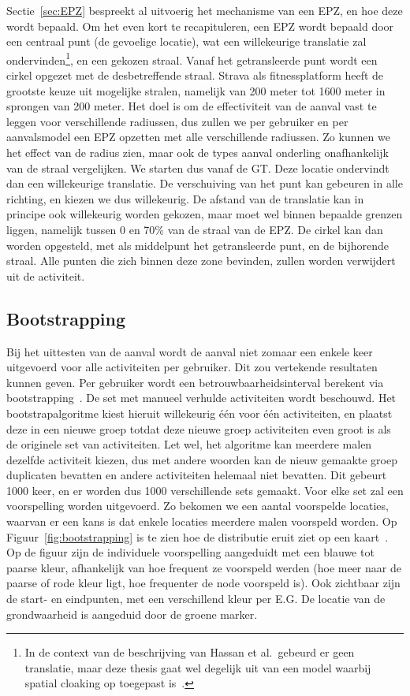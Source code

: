 Sectie~\ref{sec:EPZ} bespreekt al uitvoerig het mechanisme van een \ac{EPZ}, en
hoe deze wordt bepaald. Om het even kort te recapituleren, een \ac{EPZ} wordt
bepaald door een centraal punt (de gevoelige locatie), wat een willekeurige
translatie zal ondervinden\footnote{In de context van de beschrijving van
    Hassan et al.\ gebeurd er geen translatie, maar deze thesis gaat wel degelijk
    uit van een model waarbij spatial cloaking op toegepast
    is~\cite{sec18has3:online}.}, en een gekozen straal. Vanaf het getransleerde
punt wordt een cirkel opgezet met de desbetreffende straal. Strava als
fitnessplatform heeft de grootste keuze uit mogelijke stralen, namelijk van 200
meter tot 1600 meter in sprongen van 200 meter. Het doel is om de effectiviteit
van de aanval vast te leggen voor verschillende radiussen, dus zullen we per
gebruiker en per aanvalsmodel een \ac{EPZ} opzetten met alle verschillende
radiussen. Zo kunnen we het effect van de radius zien, maar ook de types aanval
onderling onafhankelijk van de straal vergelijken. We starten dus vanaf de
\ac{GT}. Deze locatie ondervindt dan een willekeurige translatie. De
verschuiving van het punt kan gebeuren in alle richting, en kiezen we dus
willekeurig. De afstand van de translatie kan in principe ook willekeurig
worden gekozen, maar moet wel binnen bepaalde grenzen liggen, namelijk tussen 0
en 70\% van de straal van de \ac{EPZ}. De cirkel kan dan worden opgesteld, met
als middelpunt het getransleerde punt, en de bijhorende straal. Alle punten die
zich binnen deze zone bevinden, zullen worden verwijdert uit de activiteit.

\subsection{Bootstrapping}
Bij het uittesten van de aanval wordt de aanval niet zomaar een enkele keer
uitgevoerd voor alle activiteiten per gebruiker. Dit zou vertekende resultaten
kunnen geven. Per gebruiker wordt een betrouwbaarheidsinterval berekent via
bootstrapping~\cite{Dhondt, Verdonck_2022}. De set met manueel verhulde
activiteiten wordt beschouwd. Het bootstrapalgoritme kiest hieruit willekeurig
één voor één activiteiten, en plaatst deze in een nieuwe groep totdat deze
nieuwe groep activiteiten even groot is als de originele set van activiteiten.
Let wel, het algoritme kan meerdere malen dezelfde activiteit kiezen, dus met
andere woorden kan de nieuw gemaakte groep duplicaten bevatten en andere
activiteiten helemaal niet bevatten. Dit gebeurt 1000 keer, en er worden dus
1000 verschillende sets gemaakt. Voor elke set zal een voorspelling worden
uitgevoerd. Zo bekomen we een aantal voorspelde locaties, waarvan er een kans
is dat enkele locaties meerdere malen voorspeld worden. Op
Figuur~\ref{fig:bootstrapping} is te zien hoe de distributie eruit ziet op een
kaart~\cite{Verdonck_2022}. Op de figuur zijn de individuele voorspelling
aangeduidt met een blauwe tot paarse kleur, afhankelijk van hoe frequent ze
voorspeld werden (hoe meer naar de paarse of rode kleur ligt, hoe frequenter de
node voorspeld is). Ook zichtbaar zijn de start- en eindpunten, met een
verschillend kleur per \ac{E.G.} De locatie van de grondwaarheid is aangeduid
door de groene marker.

